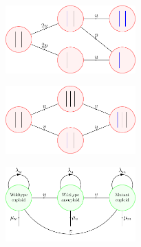 \documentclass[12pt]{extarticle}
\begin{document}
\begin{figure}
\begin{subfigure}{\textwidth}
\centering
\includegraphics[width=0.55\textwidth]{Figures/figureAneuploidy1.pdf}
\caption{}
\end{subfigure}

\bigskip

\begin{subfigure}{\textwidth}
\centering
\includegraphics[width=0.55\textwidth]{Figures/figureAneuploidy2.pdf}
\caption{}
\end{subfigure}

\bigskip

\begin{subfigure}{\textwidth}
\centering
\includegraphics[width=0.55\textwidth]{Figures/figureAneuploidy3.pdf}
\caption{}
\label{figureAneuploidy}
\end{subfigure}


\end{figure}
\end{document}
